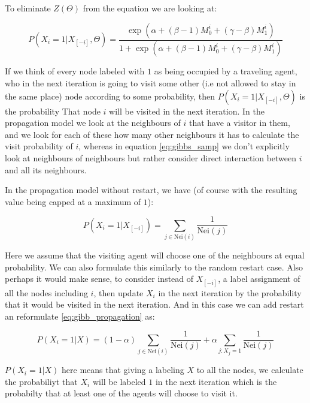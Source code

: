\documentclass[a4paper,10pt]{article}
\theoremstyle{definition}
\theoremstyle{remark}
\theoremstyle{plain}
\begin{document}
To eliminate $Z(\Theta)$ from the equation we are looking at:

\begin{equation} \label{eq:gibbs_samp}
P(X_i=1 | X_{[-i]}, \Theta) =
\frac{\exp(\alpha + (\beta -1)M_0^{i} + (\gamma - \beta)M_1^{i})}{
1 + \exp(\alpha + (\beta -1)M_0^{i} + (\gamma - \beta)M_1^{i})}
\end{equation}

If we think of every node labeled with $1$ as being occupied by a traveling
agent, who in the next iteration is going to visit some other (i.e not allowed
to stay in the same place) node according to some
probability, then $P(X_i = 1 | X_{[-i]}, \Theta)$ is the probability 
That node $i$ will be visited in the next iteration. In the propagation model
we look at the neighbours of $i$ that have a visitor in them, and we 
look for each of these how many other neighbours it has to calculate the 
visit probability of $i$, whereas in equation \eqref{eq:gibbs_samp} we don't
explicitly look at neighbours of neighbours but rather consider direct
interaction between $i$ and all its neighbours.

In the propagation model without restart, we have (of course with 
the resulting
value being capped at a maximum of $1$):

\begin{equation}
\label{eq:gibb_propagation}
P(X_i=1 | X_{[-i]}) = 
\sum_{j \in \text{Nei}(i)} \frac{1}{\text{Nei}(j)}
\end{equation}

Here we assume that the visiting agent will choose one of the neighbours at
equal probability. We can also formulate this similarly to the random restart
case. Also perhaps it would make sense, to consider instead of $X_{[-i]}$, a
label assignment of all the nodes including $i$, then update $X_i$ in the next
iteration by the probability that it would be visited in the next iteration.
And in this case we can add restart an reformulate \eqref{eq:gibb_propagation}
as: 

\begin{equation}
\label{eq:gibb_propagation_restart}
P(X_i=1 | X) = 
(1-\alpha) \sum_{j \in \text{Nei}(i)} \frac{1}{\text{Nei}(j)}
+ \alpha \sum_{j : X_j=1} \frac{1}{\text{Nei}(j)}
\end{equation}

$P(X_i=1 | X)$ here means that giving a labeling $X$ to all the nodes, we
calculate the probabiliyt that $X_i$ will be labeled $1$ in the next iteration
which is the probabilty that at least one of the agents will choose to visit it.
\end{document}
